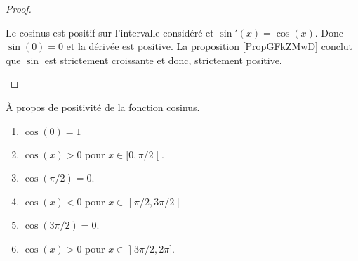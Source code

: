 \begin{proof}
\begin{enumerate}
		      Le cosinus est positif sur l'intervalle considéré et \( \sin'(x)=\cos(x)\). Donc \( \sin(0)=0\) et la dérivée est positive. La proposition \ref{PropGFkZMwD} conclut que \( \sin\) est strictement croissante et donc, strictement positive.
	\end{enumerate}
\end{proof}

\begin{lemma}      \label{LEMooFESYooBoiuol}
	À propos de positivité de la fonction cosinus.
	\begin{enumerate}
		\item       \label{ITEMooIXSDooJyCQyb}
		      \( \cos(0)=1\)
		\item       \label{ITEMooWJEVooGZykbO}
		      \( \cos(x)>0\) pour \( x\in\mathopen[ 0 , \pi/2 \mathclose[\).
		\item       \label{ITEMooANEPooLGmYtc}
		      \( \cos(\pi/2)=0\).
		\item       \label{ITEMooRDWJooZXWyfv}
		      \( \cos(x)<0\) pour \( x\in \mathopen] \pi/2 , 3\pi/2 \mathclose[\)
		\item       \label{ITEMooFKPAooBNlvPU}
		      \( \cos(3\pi/2)=0\).
		\item       \label{ITEMooIDZGooBTDvDF}
		      \( \cos(x)>0\) pour \( x\in\mathopen] 3\pi/2 , 2\pi \mathclose]\).
	\end{enumerate}
\end{lemma}

